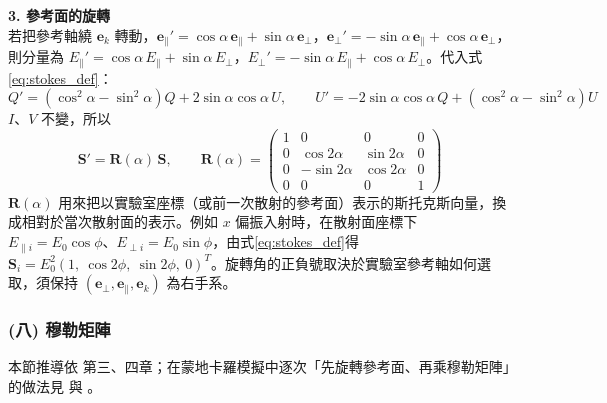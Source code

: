 \textbf{3. 參考面的旋轉}\\
若把參考軸繞 $\mathbf{e}_k$ 轉動，$\mathbf{e}_{\parallel}' = \cos\alpha\, \mathbf{e}_{\parallel} + \sin\alpha\, \mathbf{e}_{\perp}$，$\mathbf{e}_{\perp}' = -\sin\alpha\, \mathbf{e}_{\parallel} + \cos\alpha\, \mathbf{e}_{\perp}$，則分量為 $E_{\parallel}' = \cos\alpha\, E_{\parallel} + \sin\alpha\, E_{\perp}$，$E_{\perp}' = -\sin\alpha\, E_{\parallel} + \cos\alpha\, E_{\perp}$。代入式\eqref{eq:stokes_def}：
\begin{equation}
    Q' = \left(\cos^2\alpha - \sin^2\alpha\right) Q + 2\sin\alpha\cos\alpha\, U, \qquad U' = -2\sin\alpha\cos\alpha\, Q + \left(\cos^2\alpha - \sin^2\alpha\right) U
\end{equation}
$I$、$V$ 不變，所以
\begin{equation}
    \mathbf{S}' = \mathbf{R}(\alpha)\, \mathbf{S}, \qquad \mathbf{R}(\alpha) = \begin{pmatrix} 1 & 0 & 0 & 0 \\ 0 & \cos 2\alpha & \sin 2\alpha & 0 \\ 0 & -\sin 2\alpha & \cos 2\alpha & 0 \\ 0 & 0 & 0 & 1 \end{pmatrix} \label{eq:rot}
\end{equation}
$\mathbf{R}(\alpha)$ 用來把以實驗室座標（或前一次散射的參考面）表示的斯托克斯向量，換成相對於當次散射面的表示。例如 $x$ 偏振入射時，在散射面座標下 $E_{\parallel i} = E_0\cos\phi$、$E_{\perp i} = E_0\sin\phi$，由式\eqref{eq:stokes_def}得 $\mathbf{S}_i = E_0^2 \left(1,\ \cos 2\phi,\ \sin 2\phi,\ 0\right)^{T}$。旋轉角的正負號取決於實驗室參考軸如何選取，須保持 $(\mathbf{e}_{\perp}, \mathbf{e}_{\parallel}, \mathbf{e}_k)$ 為右手系。

\subsubsection*{(八) 穆勒矩陣}
本節推導依 \textcite{bohren1983Absorption} 第三、四章；在蒙地卡羅模擬中逐次「先旋轉參考面、再乘穆勒矩陣」的做法見 \textcite{ramellaRoman2005ThreeMC} 與 \textcite{bartel2000MonteCarlo}。\\

